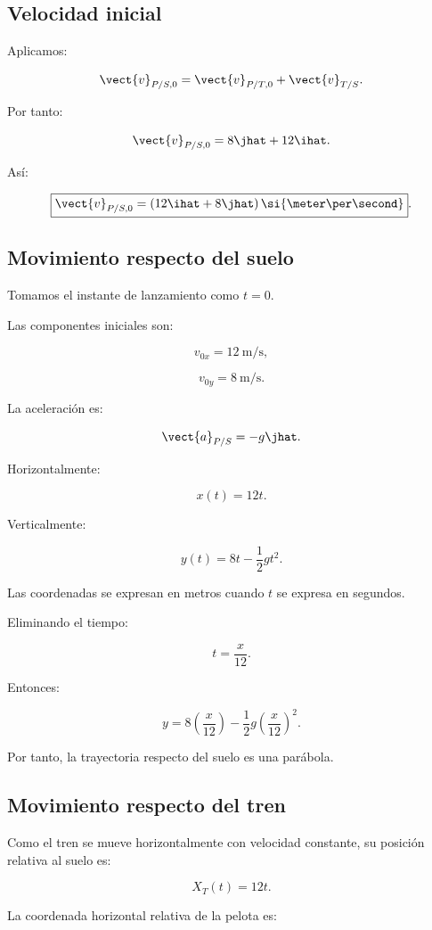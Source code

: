 \subsection*{Velocidad inicial}

Aplicamos:

\[
\vect{v}_{P/S,0}
=
\vect{v}_{P/T,0}
+
\vect{v}_{T/S}.
\]

Por tanto:

\[
\vect{v}_{P/S,0}
=
8\jhat+12\ihat.
\]

Así:

\[
\boxed{
\vect{v}_{P/S,0}
=
(12\ihat+8\jhat)\,
\si{\meter\per\second}
}.
\]

\subsection*{Movimiento respecto del suelo}

Tomamos el instante de lanzamiento como \(t=0\).

Las componentes iniciales son:

\[
v_{0x}=\SI{12}{\meter\per\second},
\]

\[
v_{0y}=\SI{8}{\meter\per\second}.
\]

La aceleración es:

\[
\vect{a}_{P/S}=-g\jhat.
\]

Horizontalmente:

\[
\boxed{
x(t)=12t
}.
\]

Verticalmente:

\[
\boxed{
y(t)=8t-\frac12gt^2
}.
\]

Las coordenadas se expresan en metros
cuando \(t\) se expresa en segundos.

Eliminando el tiempo:

\[
t=\frac{x}{12}.
\]

Entonces:

\[
y
=
8\left(\frac{x}{12}\right)
-
\frac12g\left(\frac{x}{12}\right)^2.
\]

Por tanto, la trayectoria respecto del suelo
es una parábola.

\subsection*{Movimiento respecto del tren}

Como el tren se mueve horizontalmente
con velocidad constante, su posición relativa
al suelo es:

\[
X_T(t)=12t.
\]

La coordenada horizontal relativa de la pelota es:

